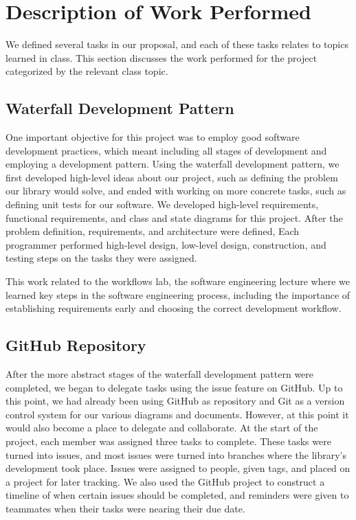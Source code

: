 \section{Description of Work Performed}
We defined several tasks in our proposal, and each of these tasks relates to topics learned in class. This section discusses the work performed for the project categorized by the relevant class topic.
\subsection{Waterfall Development Pattern}
One important objective for this project was to employ good software development practices, which meant including all stages of development and employing a development pattern. Using the waterfall development pattern, we first developed high-level ideas about our project, such as defining the problem our library would solve, and ended with working on more concrete tasks, such as defining unit tests for our software. We developed high-level requirements, functional requirements, and class and state diagrams for this project. After the problem definition, requirements, and architecture were defined, Each programmer performed high-level design, low-level design, construction, and testing steps on the tasks they were assigned. 

This work related to the workflows lab, the software engineering lecture where we learned key steps in the software engineering process, including the importance of establishing requirements early and choosing the correct development workflow.
\subsection{GitHub Repository}
After the more abstract stages of the waterfall development pattern were completed, we began to delegate tasks using the issue feature on GitHub. Up to this point, we had already been using GitHub as repository and Git as a version control system for our various diagrams and documents. However, at this point it would also become a place to delegate and collaborate. At the start of the project, each member was assigned three tasks to complete. These tasks were turned into issues, and most issues were turned into branches where the library's development took place. Issues were assigned to people, given tags, and placed on a project for later tracking. We also used the GitHub project to construct a timeline of when certain issues should be completed, and reminders were given to teammates when their tasks were nearing their due date. 

